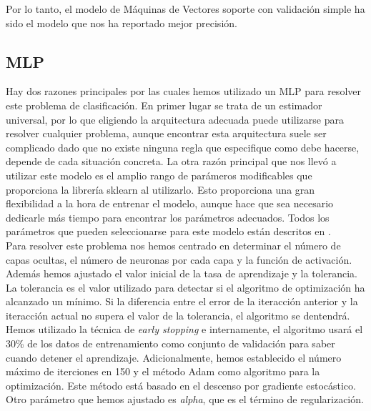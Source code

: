 \documentclass[journal,twoside]{JoPhA}
\begin{document}
Por lo tanto, el modelo de Máquinas de Vectores soporte con validación simple ha sido el modelo que nos ha reportado mejor precisión.


\subsection{MLP}
Hay dos razones principales por las cuales hemos utilizado un MLP para resolver este problema de clasificación. En primer lugar se trata de un estimador universal, por lo que eligiendo la arquitectura adecuada puede utilizarse para resolver cualquier problema, aunque encontrar esta arquitectura suele ser complicado dado que no existe ninguna regla que especifique como debe hacerse, depende de cada situación concreta. La otra razón principal que nos llevó a utilizar este modelo es el amplio rango de parámeros modificables que proporciona la librería sklearn al utilizarlo. Esto proporciona una gran flexibilidad a la hora de entrenar el modelo, aunque hace que sea necesario dedicarle más tiempo para encontrar los parámetros adecuados. Todos los parámetros que pueden seleccionarse para este modelo están descritos en \cite{mlp}. \\

Para resolver este problema nos hemos centrado en determinar el número de capas ocultas, el número de neuronas por cada capa y la función de activación. Además hemos ajustado el valor inicial de la tasa de aprendizaje y la tolerancia. La tolerancia es el valor utilizado para detectar si el algoritmo de optimización ha alcanzado un mínimo. Si la diferencia entre el error de la iteracción anterior y la iteracción actual no supera el valor de la tolerancia, el algoritmo se dentendrá. Hemos utilizado la técnica de \textit{early stopping} e internamente, el algoritmo usará el 30\% de los datos de entrenamiento como conjunto de validación para saber cuando detener el aprendizaje. Adicionalmente, hemos establecido el número máximo de iterciones en 150 y el método Adam como algoritmo para la optimización. Este método está basado en el descenso por gradiente estocástico. Otro parámetro que hemos ajustado es \textit{alpha}, que es el término de regularización. \\
\end{document}
